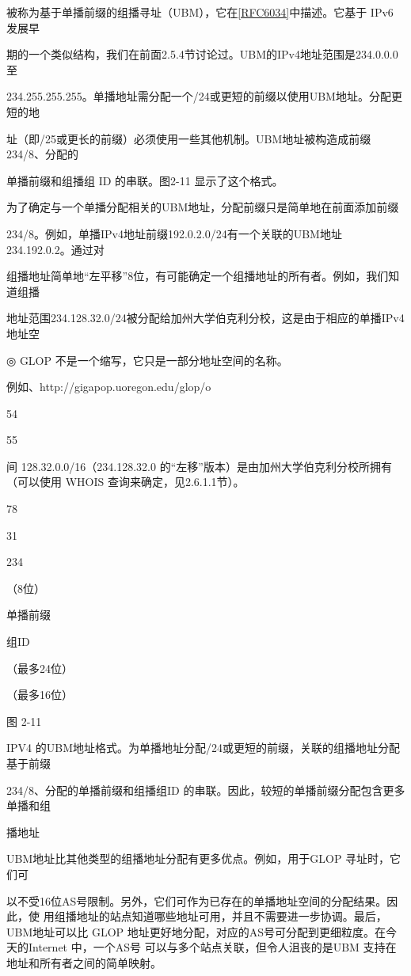 被称为基于单播前缀的组播寻址（UBM），它在\href{https://www.rfc-editor.org/rfc/rfc6034}{[RFC6034]}中描述。它基于 IPv6 发展早

期的一个类似结构，我们在前面2.5.4节讨论过。UBM的IPv4地址范围是234.0.0.0至

234.255.255.255。单播地址需分配一个/24或更短的前缀以使用UBM地址。分配更短的地

址（即/25或更长的前缀）必须使用一些其他机制。UBM地址被构造成前缀234/8、分配的

单播前缀和组播组 ID 的串联。图2-11 显示了这个格式。

为了确定与一个单播分配相关的UBM地址，分配前缀只是简单地在前面添加前缀

234/8。例如，单播IPv4地址前缀192.0.2.0/24有一个关联的UBM地址234.192.0.2。通过对

组播地址简单地“左平移”8位，有可能确定一个组播地址的所有者。例如，我们知道组播

地址范围234.128.32.0/24被分配给加州大学伯克利分校，这是由于相应的单播IPv4地址空

◎ GLOP 不是一个缩写，它只是一部分地址空间的名称。

例如、http://gigapop.uoregon.edu/glop/o

54

55

间 128.32.0.0/16（234.128.32.0 的“左移”版本）是由加州大学伯克利分校所拥有（可以使用
WHOIS 查询来确定，见2.6.1.1节）。

78

31

234

（8位）

单播前缀

组ID

（最多24位）

（最多16位）

图 2-11

IPV4 的UBM地址格式。为单播地址分配/24或更短的前缀，关联的组播地址分配基于前缀

234/8、分配的单播前缀和组播组ID 的串联。因此，较短的单播前缀分配包含更多单播和组

播地址

UBM地址比其他类型的组播地址分配有更多优点。例如，用于GLOP 寻址时，它们可

以不受16位AS号限制。另外，它们可作为已存在的单播地址空间的分配结果。因此，使
用组播地址的站点知道哪些地址可用，并且不需要进一步协调。最后，UBM地址可以比
GLOP 地址更好地分配，对应的AS号可分配到更细粒度。在今天的Internet 中，一个AS号
可以与多个站点关联，但令人沮丧的是UBM 支持在地址和所有者之间的简单映射。


